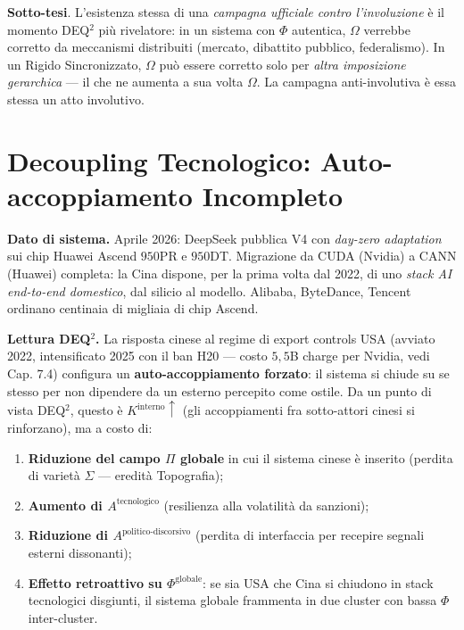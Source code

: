 \Conj{} \textbf{Sotto-tesi}. L'esistenza stessa di una \emph{campagna
ufficiale contro l'involuzione} è il momento DEQ$^2$ più rivelatore: in un
sistema con \(\Phi\) autentica, \(\Omega\) verrebbe corretto da
meccanismi distribuiti (mercato, dibattito pubblico, federalismo). In un
Rigido Sincronizzato, \(\Omega\) può essere corretto solo per
\emph{altra imposizione gerarchica} --- il che ne aumenta a sua volta
\(\Omega\). La campagna anti-involutiva è essa stessa un atto
involutivo.



\section{Decoupling Tecnologico: Auto-accoppiamento
Incompleto}\label{decoupling-tecnologico-auto-accoppiamento-incompleto}

\Proved{} \textbf{Dato di sistema.} Aprile 2026: DeepSeek pubblica V4
con \emph{day-zero adaptation} sui chip Huawei Ascend \(950\)PR e
\(950\)DT. Migrazione da CUDA (Nvidia) a CANN (Huawei) completa: la Cina
dispone, per la prima volta dal 2022, di uno \emph{stack AI end-to-end
domestico}, dal silicio al modello. Alibaba, ByteDance, Tencent ordinano
centinaia di migliaia di chip Ascend.

\Hypoth{} \textbf{Lettura DEQ$^2$.} La risposta cinese al regime di export
controls USA (avviato 2022, intensificato 2025 con il ban H20 --- costo
\(5{,}5\)B charge per Nvidia, vedi Cap. 7.4) configura un
\textbf{auto-accoppiamento forzato}: il sistema si chiude su se stesso
per non dipendere da un esterno percepito come ostile. Da un punto di
vista DEQ$^2$, questo è \(K^{\text{interno}} \uparrow\) (gli accoppiamenti
fra sotto-attori cinesi si rinforzano), ma a costo di:

\begin{enumerate}
\def\labelenumi{\arabic{enumi}.}
\tightlist
\item
  \textbf{Riduzione del campo \(\Pi\) globale} in cui il sistema cinese
  è inserito (perdita di varietà \(\Sigma\) --- eredità Topografia);
\item
  \textbf{Aumento di \(A^{\text{tecnologico}}\)} (resilienza alla
  volatilità da sanzioni);
\item
  \textbf{Riduzione di \(A^{\text{politico-discorsivo}}\)} (perdita di
  interfaccia per recepire segnali esterni dissonanti);
\item
  \textbf{Effetto retroattivo su \(\Phi^{\text{globale}}\)}: se sia USA
  che Cina si chiudono in stack tecnologici disgiunti, il sistema
  globale frammenta in due cluster con bassa \(\Phi\) inter-cluster.
\end{enumerate}

